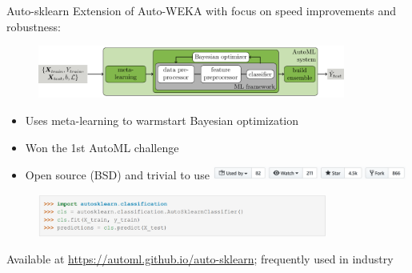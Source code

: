 \begin{frame}[c]{Auto-sklearn }
Extension of Auto-WEKA with focus on speed improvements and robustness:
\begin{figure}
    \centering
    \includegraphics[width=0.9\textwidth]{images/success_stories/automlworkflow.pdf}
\end{figure}
\begin{itemize}
    \item Uses meta-learning to warmstart Bayesian optimization
    \item Won the 1st AutoML challenge
\pause
    \item Open source (BSD) and trivial to use \includegraphics[width=0.5\textwidth]{images/success_stories/auto-sklearn-repo-stats.png}
\end{itemize}
\begin{figure}
    \centering
    \includegraphics[width=0.85\textwidth]{images/success_stories/Auto-sklearn_01.png}
\end{figure}
\vspace*{-0.1cm}
Available at \url{https://automl.github.io/auto-sklearn}; frequently used in industry

\end{frame}

